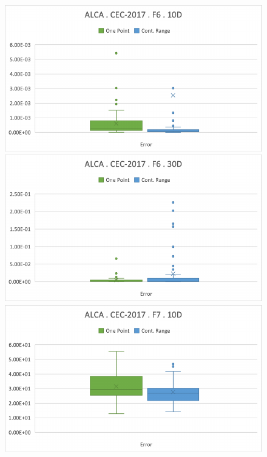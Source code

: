 \documentclass[graybox]{svmult}
\begin{document}
\begin{figure}[!ht]
\begin{minipage}[h]{0.49\linewidth}
        \end{minipage}
        \vfill
        \vspace{0.05 cm}
        \begin{minipage}[h]{0.49\linewidth}
            \includegraphics[width=1\linewidth]{img/fig_experiment_F6x10D.pdf} 
        \end{minipage}
        \hfill
        \begin{minipage}[h]{0.49\linewidth}
            \includegraphics[width=1\linewidth]{img/fig_experiment_F6x30D.pdf} 
        \end{minipage}
        \vfill
        \vspace{0.05 cm}
        \begin{minipage}[h]{0.49\linewidth}
            \includegraphics[width=1\linewidth]{img/fig_experiment_F7x10D.pdf} 

\end{minipage}
\end{figure}
\end{document}
